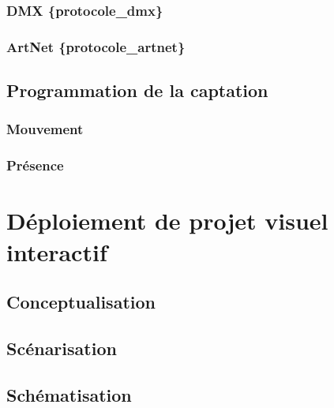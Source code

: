 \documentclass[
]{book}
\begin{document}
\hypertarget{dmx-protocole_dmx}{%
\subsection{DMX \{protocole\_dmx\}}\label{dmx-protocole_dmx}}

\hypertarget{artnet-protocole_artnet}{%
\subsection{ArtNet \{protocole\_artnet\}}\label{artnet-protocole_artnet}}

\hypertarget{interagir_video}{%
\section{Programmation de la captation}\label{interagir_video}}

\hypertarget{interagir_mouvement}{%
\subsection{Mouvement}\label{interagir_mouvement}}

\hypertarget{interagir_presence}{%
\subsection{Présence}\label{interagir_presence}}

\hypertarget{duxe9ploiement-de-projet-visuel-interactif}{%
\chapter{Déploiement de projet visuel interactif}\label{duxe9ploiement-de-projet-visuel-interactif}}

\hypertarget{conceptualisation}{%
\section{Conceptualisation}\label{conceptualisation}}

\hypertarget{scuxe9narisation}{%
\section{Scénarisation}\label{scuxe9narisation}}

\hypertarget{schuxe9matisation}{%
\section{Schématisation}\label{schuxe9matisation}}
\end{document}

